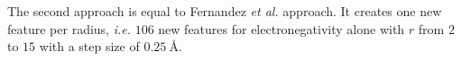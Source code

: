 	The second approach is equal to Fernandez \textit{et al.} approach. It creates one new feature per radius, \textit{i.e.} $106$ new features for electronegativity alone with $r$ from $2$ to $15$ with a step size of $\SI{0.25}{Å}$.  	 


\begin{comment}
\subsection{Algorithm}

First of all, a wrote a program for "scraping" the \textit{materialsproject}webpage for batteries (0). This gave us the possibility to gather all the available resources on the batteries in the database in a fast and effective manor, as well as updating these CSV files of  battery-IDs. 

We then run a second program that downloads all the information on the materials that matches a material-ID correlated to a battery-ID (1,2).  Before constructing a CIF file structured so that all the battery-IDs, charged-material-IDs, and dischargerd-material-IDs are correlated with the information on the charged and discharged properties. 

After, the volumetric density fraction is calculated (3) and added to the main CSV file for both charged and discharged materials. While the CIF files are being processed for Poreblazer (4) where the void fraction is calculated (5,6). 

Then we merge all our CSV files based on what properties that we are interested in and makes a CSV file called for\_ML.csv (7,8) that we feed into our random forest algorithm(9). We then run cross validation, MSE, and plot what we are interested in (10).
\end{comment}



